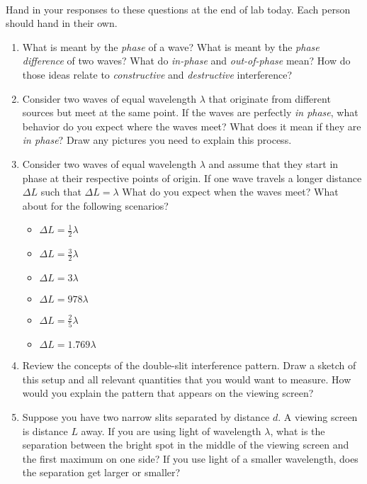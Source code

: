 \documentclass{tufte-handout}
\begin{document}



\vspace{0.5cm}
\\
\vspace{0.5cm}

Hand in your responses to these questions at the end of lab today. Each person should hand in their own.

\begin{enumerate}

\item What is meant by the {\em phase} of a wave?  What is meant by the {\em phase difference} of two waves? What do {\em in-phase} and {\em out-of-phase} mean?  How do those ideas relate to {\em constructive} and {\em destructive} interference?

\item Consider two waves of equal wavelength $\lambda$ that originate from 
different sources but meet at the same point.
If the waves are perfectly {\it in phase}, what behavior do you expect where the waves meet?
What does it mean if they are {\it in phase}? Draw any pictures you need to explain this process.

\item Consider two waves of equal wavelength $\lambda$ and assume that they start in phase at their respective
points of origin. If one wave travels a longer distance $\Delta L$ such that $\Delta L = \lambda$
What do you expect when the waves meet? What about for the following scenarios?
\begin{itemize}[itemsep=0pt,parsep=0pt,topsep=0pt,partopsep=0pt]
    \item $\Delta L = \frac{1}{2}\lambda$
    \item $\Delta L = \frac{3}{2}\lambda$
    \item $\Delta L = 3\lambda$
    \item $\Delta L = 978\lambda$
    \item $\Delta L = \frac{2}{5}\lambda$
    \item $\Delta L = 1.769\lambda$
\end{itemize}

\item Review the concepts of the double-slit interference pattern. Draw a sketch of this setup and
all relevant quantities that you would want to measure. How would you explain the pattern that appears on the 
viewing screen?

\item Suppose you have two narrow slits separated by distance $d$. A viewing screen is distance $L$ away. If you are
using light of wavelength $\lambda$, what is the separation between the bright spot in the middle of
the viewing screen and the first maximum on one side? If you use light of a smaller wavelength, does
the separation get larger or smaller?


\end{enumerate}
\end{document}
